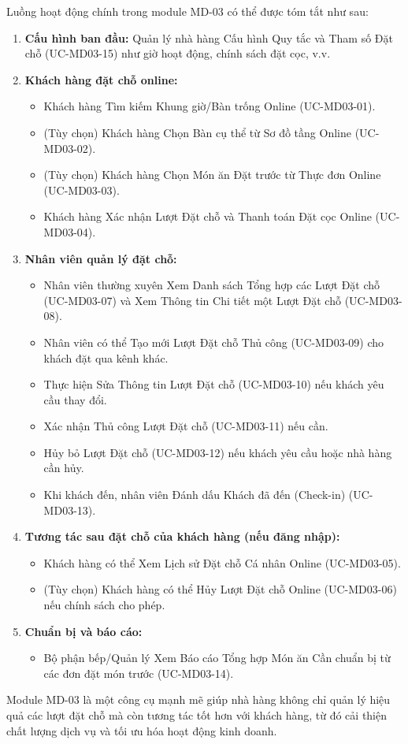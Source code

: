 \label{sssec:md03_overall_workflow}
Luồng hoạt động chính trong module MD-03 có thể được tóm tắt như sau:

\begin{enumerate}
    \item \textbf{Cấu hình ban đầu:} Quản lý nhà hàng Cấu hình Quy tắc và Tham số Đặt chỗ (UC-MD03-15) như giờ hoạt động, chính sách đặt cọc, v.v.
    \item \textbf{Khách hàng đặt chỗ online:}
        \begin{itemize}
            \item Khách hàng Tìm kiếm Khung giờ/Bàn trống Online (UC-MD03-01).
            \item (Tùy chọn) Khách hàng Chọn Bàn cụ thể từ Sơ đồ tầng Online (UC-MD03-02).
            \item (Tùy chọn) Khách hàng Chọn Món ăn Đặt trước từ Thực đơn Online (UC-MD03-03).
            \item Khách hàng Xác nhận Lượt Đặt chỗ và Thanh toán Đặt cọc Online (UC-MD03-04).
        \end{itemize}
    \item \textbf{Nhân viên quản lý đặt chỗ:}
        \begin{itemize}
            \item Nhân viên thường xuyên Xem Danh sách Tổng hợp các Lượt Đặt chỗ (UC-MD03-07) và Xem Thông tin Chi tiết một Lượt Đặt chỗ (UC-MD03-08).
            \item Nhân viên có thể Tạo mới Lượt Đặt chỗ Thủ công (UC-MD03-09) cho khách đặt qua kênh khác.
            \item Thực hiện Sửa Thông tin Lượt Đặt chỗ (UC-MD03-10) nếu khách yêu cầu thay đổi.
            \item Xác nhận Thủ công Lượt Đặt chỗ (UC-MD03-11) nếu cần.
            \item Hủy bỏ Lượt Đặt chỗ (UC-MD03-12) nếu khách yêu cầu hoặc nhà hàng cần hủy.
            \item Khi khách đến, nhân viên Đánh dấu Khách đã đến (Check-in) (UC-MD03-13).
        \end{itemize}
    \item \textbf{Tương tác sau đặt chỗ của khách hàng (nếu đăng nhập):}
        \begin{itemize}
            \item Khách hàng có thể Xem Lịch sử Đặt chỗ Cá nhân Online (UC-MD03-05).
            \item (Tùy chọn) Khách hàng có thể Hủy Lượt Đặt chỗ Online (UC-MD03-06) nếu chính sách cho phép.
        \end{itemize}
    \item \textbf{Chuẩn bị và báo cáo:}
        \begin{itemize}
            \item Bộ phận bếp/Quản lý Xem Báo cáo Tổng hợp Món ăn Cần chuẩn bị từ các đơn đặt món trước (UC-MD03-14).
        \end{itemize}
\end{enumerate}
Module MD-03 là một công cụ mạnh mẽ giúp nhà hàng không chỉ quản lý hiệu quả các lượt đặt chỗ mà còn tương tác tốt hơn với khách hàng, từ đó cải thiện chất lượng dịch vụ và tối ưu hóa hoạt động kinh doanh.
